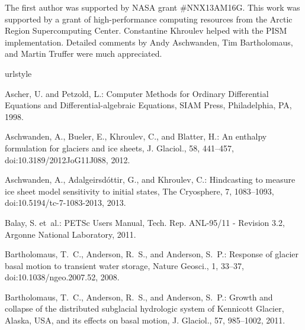 \documentclass[gmd]{copernicus}   %
\begin{document}
\begin{acknowledgements}
The first author was supported by NASA grant \#NNX13AM16G.  This work was supported by a grant of high-performance computing resources from the Arctic Region Supercomputing Center.  Constantine Khroulev helped with the PISM implementation.  Detailed comments by Andy Aschwanden, Tim Bartholomaus, and Martin Truffer were much appreciated.
\end{acknowledgements}


\begin{thebibliography}{}
\providecommand{\natexlab}[1]{#1}
\providecommand{\url}[1]{{\tt #1}}
\providecommand{\urlprefix}{URL }
\expandafter\ifx\csname urlstyle\endcsname\relax
  \providecommand{\doi}[1]{doi:\discretionary{}{}{}#1}\else
  \providecommand{\doi}{doi:\discretionary{}{}{}\begingroup
  \urlstyle{rm}\Url}\fi

Ascher, U. and Petzold, L.: Computer {M}ethods for {O}rdinary {D}ifferential
  {E}quations and {D}ifferential-algebraic {E}quations, SIAM Press,
  Philadelphia, PA, 1998.

Aschwanden, A., Bueler, E., Khroulev, C., and Blatter, H.: An enthalpy
  formulation for glaciers and ice sheets, J. Glaciol., 58, 441--457,
  \doi{10.3189/2012JoG11J088}, 2012.

Aschwanden, A., Adalgeirsd{\'o}ttir, G., and Khroulev, C.: Hindcasting to
  measure ice sheet model sensitivity to initial states, The Cryosphere, 7,
  1083--1093, \doi{10.5194/tc-7-1083-2013}, 2013.

Balay, S. et~al.: {PETS}c {U}sers {M}anual, Tech. Rep. ANL-95/11 - Revision
  3.2, Argonne National Laboratory, 2011.

Bartholomaus, T.~C., Anderson, R.~S., and Anderson, S.~P.: Response of glacier
  basal motion to transient water storage, Nature Geosci., 1, 33--37,
  \doi{10.1038/ngeo.2007.52}, 2008.

Bartholomaus, T.~C., Anderson, R.~S., and Anderson, S.~P.: Growth and collapse
  of the distributed subglacial hydrologic system of {K}ennicott {G}lacier,
  {A}laska, {USA}, and its effects on basal motion, J. Glaciol., 57, 985--1002,
  2011.


\end{thebibliography}
\end{document}
